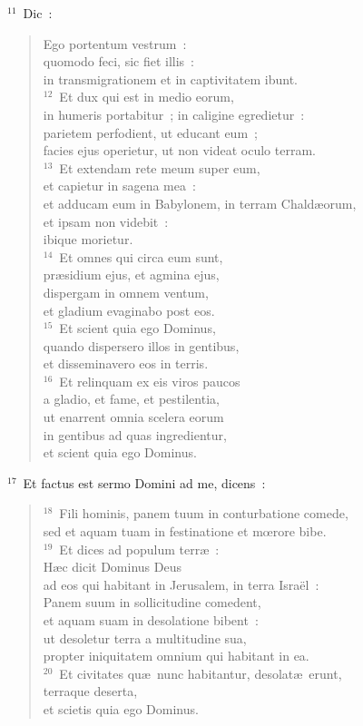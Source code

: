 ${}^{11}$~Dic~: \begin{flushleft}\begin{verse}Ego portentum vestrum~:\\ quomodo feci, sic fiet illis~:\\ in transmigrationem et in captivitatem ibunt.\\
${}^{12}$~Et dux qui est in medio eorum,\\ in humeris portabitur~; in caligine egredietur~:\\ parietem perfodient, ut educant eum~;\\ facies ejus operietur, ut non videat oculo terram.\\
${}^{13}$~Et extendam rete meum super eum,\\ et capietur in sagena mea~:\\ et adducam eum in Babylonem, in terram Chald\ae orum,\\ et ipsam non videbit~:\\ ibique morietur.\\
${}^{14}$~Et omnes qui circa eum sunt,\\ pr\ae sidium ejus, et agmina ejus,\\ dispergam in omnem ventum,\\ et gladium evaginabo post eos.\\
${}^{15}$~Et scient quia ego Dominus,\\ quando dispersero illos in gentibus,\\ et disseminavero eos in terris.\\
${}^{16}$~Et relinquam ex eis viros paucos\\ a gladio, et fame, et pestilentia,\\ ut enarrent omnia scelera eorum\\ in gentibus ad quas ingredientur,\\ et scient quia ego Dominus.\end{verse}\end{flushleft}


${}^{17}$~Et factus est sermo Domini ad me, dicens~:
\begin{flushleft}\begin{verse}${}^{18}$~Fili hominis, panem tuum in conturbatione comede,\\ sed et aquam tuam in festinatione et mœrore bibe.\\
${}^{19}$~Et dices ad populum terr\ae~:\\ H\ae c dicit Dominus Deus\\ ad eos qui habitant in Jerusalem, in terra Isra\"el~:\\ Panem suum in sollicitudine comedent,\\ et aquam suam in desolatione bibent~:\\ ut desoletur terra a multitudine sua,\\ propter iniquitatem omnium qui habitant in ea.\\
${}^{20}$~Et civitates qu\ae\ nunc habitantur, desolat\ae\ erunt,\\ terraque deserta,\\ et scietis quia ego Dominus.\end{verse}\end{flushleft}



